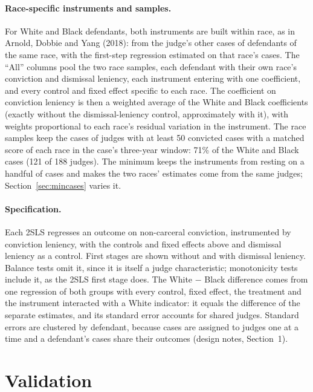 \documentclass[11pt]{article}
\begin{document}
\paragraph{Race-specific instruments and samples.} For White and Black defendants, both instruments are built within race, as in Arnold, Dobbie and Yang (2018): from the judge's other cases of defendants of the same race, with the first-step regression estimated on that race's cases. The ``All'' columns pool the two race samples, each defendant with their own race's conviction and dismissal leniency, each instrument entering with one coefficient, and every control and fixed effect specific to each race. The coefficient on conviction leniency is then a weighted average of the White and Black coefficients (exactly without the dismissal-leniency control, approximately with it), with weights proportional to each race's residual variation in the instrument. The race samples keep the cases of judges with at least 50 convicted cases with a matched score of each race in the case's three-year window: 71\% of the White and Black cases (121 of 188 judges). The minimum keeps the instruments from resting on a handful of cases and makes the two races' estimates come from the same judges; Section~\ref{sec:mincases} varies it.

\paragraph{Specification.} Each 2SLS regresses an outcome on non-carceral conviction, instrumented by conviction leniency, with the controls and fixed effects above and dismissal leniency as a control. First stages are shown without and with dismissal leniency. Balance tests omit it, since it is itself a judge characteristic; monotonicity tests include it, as the 2SLS first stage does. The White $-$ Black difference comes from one regression of both groups with every control, fixed effect, the treatment and the instrument interacted with a White indicator: it equals the difference of the separate estimates, and its standard error accounts for shared judges. Standard errors are clustered by defendant, because cases are assigned to judges one at a time and a defendant's cases share their outcomes (design notes, Section~1).

\section{Validation}\label{sec:validation}
\end{document}
